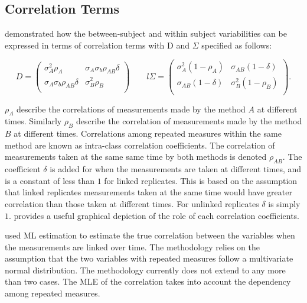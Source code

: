 \documentclass[12pt, a4paper]{report}
\theoremstyle{plain}
\theoremstyle{definition}
\theoremstyle{remark}
\begin{document}

		\subsection{Correlation Terms}

	\citet{hamlett} demonstrated how the between-subject and within subject variabilities can be expressed in terms of
	correlation terms with D and $\Sigma$ specified as follows:
	
	\[
	{D} = \left( \begin{array}{cc}
	\sigma^2_{A}\rho_{A} & \sigma_{A}\sigma_{b}\rho_{AB}\delta \\
	\sigma_{A}\sigma_{b}\rho_{AB}\delta & \sigma^2_{B}\rho_{B}\\
	
	\end{array}\right)
\qquad
	l{\Sigma} = \left(
	\begin{array}{cc}
	\sigma^2_{A}(1-\rho_{A}) & \sigma_{AB}(1-\delta)  \\
	\sigma_{AB}(1-\delta) & \sigma^2_{B}(1-\rho_{B}) \\
	\end{array}\right).
	\]
	
	$\rho_{A}$ describe the correlations of measurements made by the method $A$ at different times. Similarly $\rho_{B}$ describe the correlation of measurements made by the method $B$ at different times. Correlations among repeated measures within the same method are known as intra-class correlation coefficients.  The correlation of measurements taken at the same same time by both methods is denoted $\rho_{AB}$. The coefficient $\delta$ is added for when the measurements are taken at different times, and is a constant of less than $1$ for linked replicates. This is based on the assumption that linked replicates measurements taken at the same time would have greater correlation than those taken at different times. For unlinked replicates $\delta$ is simply $1$. \citet{hamlett} provides a useful graphical depiction of the role of each correlation coefficients.
	
	\citet{lam} used ML estimation to estimate the true correlation between the variables when the measurements are linked over time. The methodology relies on the assumption that the two variables with repeated measures follow a multivariate normal distribution. The methodology currently does not extend to any more than two cases. The MLE of the correlation takes into account the dependency among repeated measures.
	
\end{document}
